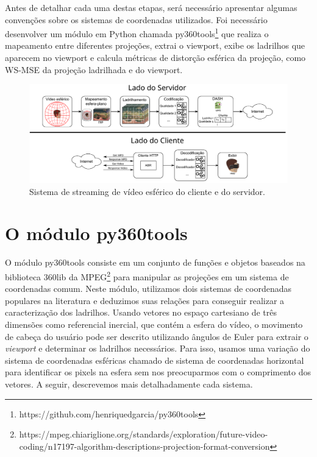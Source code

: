 Antes de detalhar cada uma destas etapas, será necessário apresentar algumas convenções sobre os sistemas de coordenadas utilizados. Foi necessário desenvolver um módulo em Python chamada py360tools\footnote{https://github.com/henriquedgarcia/py360tools} que realiza o mapeamento entre diferentes projeções, extrai o viewport, exibe os ladrilhos que aparecem no viewport e calcula métricas de distorção esférica da projeção, como WS-MSE da projeção ladrilhada e do viewport.


\begin{figure}[h]
	\centering
	\includegraphics[width=0.9\linewidth]{"fig/Streaming - client-side and server-side.pdf"}
	\caption{Sistema de streaming de vídeo esférico do cliente e do servidor.}
	\label{fig:streaming_client_server}
\end{figure}

\section{O módulo py360tools}

O módulo py360tools consiste em um conjunto de funções e objetos baseados na biblioteca 360lib da MPEG\footnote{https://mpeg.chiariglione.org/standards/exploration/future-video-coding/n17197-algorithm-descriptions-projection-format-conversion} para manipular as projeções em um sistema de coordenadas comum. Neste módulo, utilizamos dois sistemas de coordenadas populares na literatura e deduzimos suas relações para conseguir realizar a caracterização dos ladrilhos. Usando vetores no espaço cartesiano de três dimensões como referencial inercial, que contém a esfera do vídeo, o movimento de cabeça do usuário pode ser descrito utilizando ângulos de Euler para extrair o \textit{viewport} e determinar os ladrilhos necessários. Para isso, usamos uma variação do sistema de coordenadas esféricas chamado de sistema de coordenadas horizontal para identificar os pixels na esfera sem nos preocuparmos com o comprimento dos vetores. A seguir, descrevemos mais detalhadamente cada sistema.

